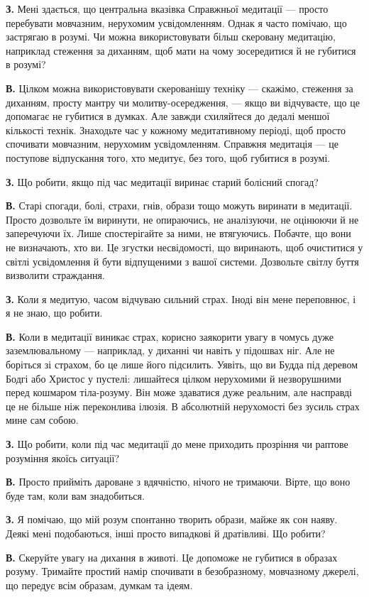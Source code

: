 \textbf{З.} Мені здається, що центральна вказівка Справжньої медитації — просто перебувати мовчазним, нерухомим усвідомленням. Однак я часто помічаю, що застрягаю в розумі. Чи можна використовувати більш скеровану медитацію, наприклад стеження за диханням, щоб мати на чому зосередитися й не губитися в розумі?

\textbf{В.} Цілком можна використовувати скерованішу техніку — скажімо, стеження за диханням, просту мантру чи молитву-осередження, — якщо ви відчуваєте, що це допомагає не губитися в думках. Але завжди схиляйтеся до дедалі меншої кількості технік. Знаходьте час у кожному медитативному періоді, щоб просто спочивати мовчазним, нерухомим усвідомленням. Справжня медитація — це поступове відпускання того, хто медитує, без того, щоб губитися в розумі.

\textbf{З.} Що робити, якщо під час медитації виринає старий болісний спогад?

\textbf{В.} Старі спогади, болі, страхи, гнів, образи тощо можуть виринати в медитації. Просто дозвольте їм виринути, не опираючись, не аналізуючи, не оцінюючи й не заперечуючи їх. Лише спостерігайте за ними, не втягуючись. Побачте, що вони не визначають, хто ви. Це згустки несвідомості, що виринають, щоб очиститися у світлі усвідомлення й бути відпущеними з вашої системи. Дозвольте світлу буття визволити страждання.

\textbf{З.} Коли я медитую, часом відчуваю сильний страх. Іноді він мене переповнює, і я не знаю, що робити.

\textbf{В.} Коли в медитації виникає страх, корисно заякорити увагу в чомусь дуже заземлювальному — наприклад, у диханні чи навіть у підошвах ніг. Але не боріться зі страхом, бо це лише його підсилить. Уявіть, що ви Будда під деревом Бодгі або Христос у пустелі: лишайтеся цілком нерухомими й незворушними перед кошмаром тіла-розуму. Він може здаватися дуже реальним, але насправді це не більше ніж переконлива ілюзія. В абсолютній нерухомості без зусиль страх мине сам собою.

\textbf{З.} Що робити, коли під час медитації до мене приходить прозріння чи раптове розуміння якоїсь ситуації?

\textbf{В.} Просто прийміть дароване з вдячністю, нічого не тримаючи. Вірте, що воно буде там, коли вам знадобиться.

\textbf{З.} Я помічаю, що мій розум спонтанно творить образи, майже як сон наяву. Деякі мені подобаються, інші просто випадкові й дратівливі. Що робити?

\textbf{В.} Скеруйте увагу на дихання в животі. Це допоможе не губитися в образах розуму. Тримайте простий намір спочивати в безобразному, мовчазному джерелі, що передує всім образам, думкам та ідеям.


